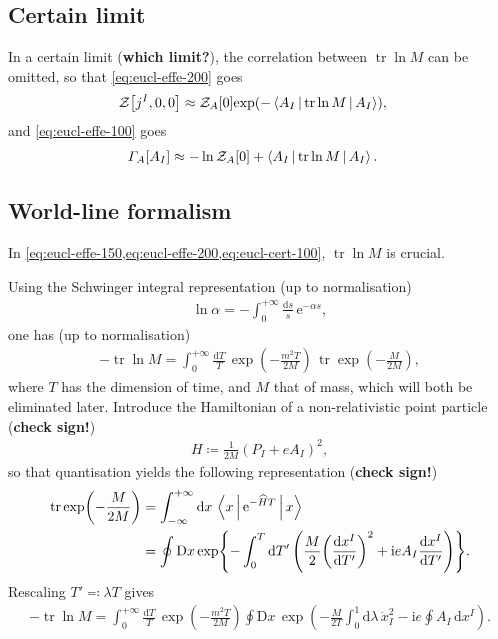 \documentclass[12pt]{article}
\newcommand\mi{\mathrm{i}} %
\newcommand\me{\mathrm{e}} %
\newcommand\dif{\mathrm{d}}
\newcommand\Dif{\mathrm{D}}
\DeclareMathOperator{\tr}{tr}
\newcommand{\rbr}[1]{{\left(#1\right)}}
\newcommand{\rfun}[2]{{#1}\mathopen{}\left(#2\right)\mathclose{}}
\newcommand{\sfun}[2]{{#1}\mathopen{}\left[#2\right]\mathclose{}}
\newcommand{\cfun}[2]{{#1}\mathopen{}\left\{#2\right\}\mathclose{}}
\newcommand{\frde}[2]{{\frac{\dif{#1}}{\dif{#2}}}}
\begin{document}
\subsection{Certain limit}
\label{ssec:eucl-cert}
In a certain limit (\textbf{which limit?}), the correlation between $\tr \ln M$ 
can be omitted, so that \cref{eq:eucl-effe-200} goes
\begin{align}
\sfun{\mathcal{Z}}{j^I, 0, 0} &\approx
\sfun{\mathcal{Z}_{A}}{0}
	\rfun{\exp}{-\Braket{A_I | \tr\ln M | A_I}},
\end{align}
and \cref{eq:eucl-effe-100} goes
\begin{align}
\sfun{\varGamma_A}{A_I} &\approx -\ln \sfun{\mathcal{Z}_{A}}{0}
	+ \Braket{A_I | \tr\ln M | A_I}.
\label{eq:eucl-cert-100}
\end{align}


\subsection{World-line formalism}
\label{ssec:eucl-wlfm}

In \cref{eq:eucl-effe-150,eq:eucl-effe-200,eq:eucl-cert-100}, $\tr\ln M$ is 
crucial.

Using the Schwinger integral representation \cite{Schwinger1951} (up to 
normalisation)
\begin{align}
\ln \alpha = -\int_0^{+\infty} \frac{\dif s}{s}\,\me^{-\alpha s},
\end{align}
one has (up to normalisation)
\begin{align}
- \tr\ln M = \int_0^{+\infty} \frac{\dif T}{T}\,
	\rfun{\exp}{-\frac{m^2 T}{2M}}\,
	\tr \rfun{\exp}{-\frac{M}{2M}},
\end{align}
where $T$ has the dimension of time, and $M$ that of mass, which will both be 
eliminated later. Introduce the Hamiltonian of a non-relativistic point 
particle (\textbf{check sign!})
\begin{align}
H \coloneqq \frac{1}{2M} \rbr{P_I + e A_I}^2,
\end{align}
so that quantisation yields the following representation (\textbf{check sign!})
\begin{align}
\tr \rfun{\exp}{-\frac{M}{2M}} &= \int_{-\infty}^{+\infty}\dif x\,
\Braket{x | \me^{-\widehat{H} T} | x}
\\
&= \oint \Dif x\,\cfun{\exp}{-\int_{0}^{T}\dif T'\,
	\rbr{\frac{M}{2} \rbr{\frde{x^I}{T'}}^2 + \mi e A_I \frde{x^I}{T'}}}.
\label{eq:eucl-wlfm-050}
\end{align}
Rescaling $T' \eqqcolon \lambda T$ gives
\begin{align}
- \tr\ln M = \int_{0}^{+\infty} \frac{\dif T}{T}\,
	\rfun{\exp}{-\frac{m^2 T}{2M}}
	\oint \Dif x\,
		\rfun{\exp}{-\frac{M}{2T} \int_{0}^{1} \dif \lambda\, \dot{x}_I^2
			- \mi e \oint A_I\,\dif x^I}.
\label{eq:eucl-wlfm-100}
\end{align}
\end{document}
